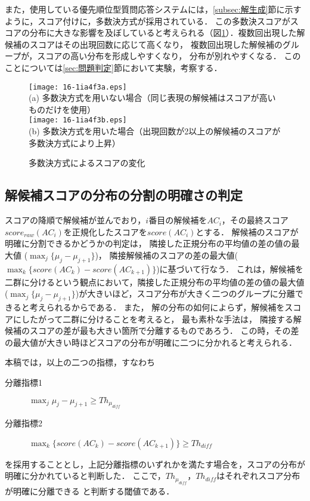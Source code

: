 \documentclass[japanese]{jnlp_1.4}
\begin{document}
また，使用している優先順位型質問応答システムには，\ref{subsec:解生成}節に示すように，スコア付けに，多数決方式が採用されている．
この多数決スコアがスコアの分布に大きな影響を及ぼしていると考えられる（図\ref{fig:WeightedScore}）．複数回出現した解候補のスコアはその出現回数に応じて高くなり，
複数回出現した解候補のグループが，スコアの高い分布を形成しやすくなり，
分布が別れやすくなる．
このことについては\ref{sec:問題判定}節において実験，考察する．

\begin{figure}[t]
\small
\begin{center}
\texttt{[image: 16-1ia4f3a.eps]} \\
(a) 多数決方式を用いない場合（同じ表現の解候補はスコアが高いものだけを使用）\\[1\baselineskip]
\texttt{[image: 16-1ia4f3b.eps]} \\
(b) 多数決方式を用いた場合（出現回数が2以上の解候補のスコアが多数決方式により上昇）\\
\end{center}
\caption{多数決方式によるスコアの変化}
\label{fig:WeightedScore}
\end{figure}


\subsection{解候補スコアの分布の分割の明確さの判定}\label{sec:分布の判定}

スコアの降順で解候補が並んでおり，$i$番目の解候補を$AC_i$，その最終スコア$score_{raw}(AC_i)$を正規化したスコアを$score(AC_i)$とする．
解候補のスコアが明確に分割できるかどうかの判定は，
隣接した正規分布の平均値の差の値の最大値 ($\max_j \{\mu_j-\mu_{j+1}\}$)，
隣接解候補のスコアの差の最大値($\max_k \{score(AC_k)-score(AC_{k+1})\}$)に基づいて行なう．
これは，解候補を二群に分けるという観点において，隣接した正規分布の平均値の差の値の最大値($\max_j \{\mu_j-\mu_{j+1}\}$)が大きいほど，スコア分布が大きく二つのグループに分離できると考えられるからである．
また，
解の分布の如何によらず，解候補をスコアにしたがって二群に分けることを考えると，
最も素朴な手法は，
隣接する解候補のスコアの差が最も大きい箇所で分離するものであろう．
この時，その差の最大値が大きい時ほどスコアの分布が明確に二つに分かれると考えられる．

本稿では，以上の二つの指標，すなわち
\begin{description}
\item[分離指標1] $\max_j {\mu_j - \mu_{j+1}} \geq Th_{\mu_{\mathit{diff}}}$
\item[分離指標2] $\max_k \{score(AC_k)-score(AC_{k+1})\} \geq Th_{\mathit{diff}}$
\end{description}
を採用することとし，上記分離指標のいずれかを満たす場合を，スコアの分布が明確に分かれていると判断した．
ここで，$Th_{\mu_{\mathit{diff}}}$，$Th_{\mathit{diff}}$はそれぞれスコア分布が明確に分離できる
と判断する閾値である．
\end{document}
